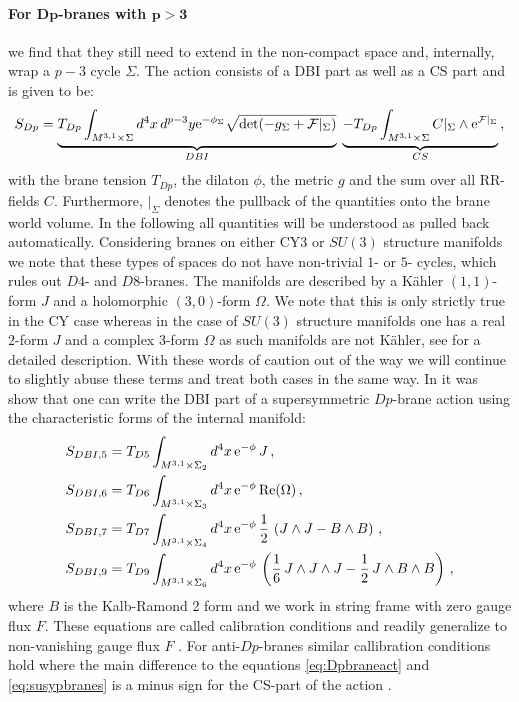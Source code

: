 \documentclass[a4paper,12pt]{report}
\newcommand{\be}{\begin{equation}}
\newcommand{\ee}{\end{equation}}
\newcommand{\bea}{\begin{equation}\begin{aligned}}
\newcommand{\eea}{\end{aligned}\end{equation}}
\def\rme{{\rm e}}
\def\rmre{{\rm Re}}
\begin{document}
\paragraph{For $\mathbf{Dp}$-branes with $\mathbf{p>3}$} we find that they still need to extend in the non-compact space and, internally, wrap a $p-3$ cycle $\Sigma$. The action consists of a DBI part as well as a CS part and is given to be:
\be 
S_{Dp} = \underbrace{T_{Dp} \int_{M^{3,1}\times \Sigma} d^4x \,d^{p-3}y \rme^{-\phi_\Sigma}\sqrt{\det (-g_\Sigma + \mathcal{F}|_\Sigma)}}_{DBI} \;\underbrace{- T_{Dp} \int_{M^{3,1}\times \Sigma} C|_\Sigma \wedge \rme^{\mathcal{F}|_\Sigma}}_{CS}\,,
\label{eq:Dpbraneact}
\ee
with the brane tension $T_{Dp}$, the dilaton $\phi$, the metric $g$ and the sum over all RR-fields $C$. Furthermore, $|_\Sigma$ denotes the pullback of the quantities onto the brane world volume. In the following all quantities will be understood as pulled back automatically. Considering branes on either CY3 or $SU(3)$ structure manifolds we note that these types of spaces do not have non-trivial $1$- or $5$- cycles, which rules out $D4$- and $D8$-branes. The manifolds are described by a Kähler $(1,1)$-form $J$ and a holomorphic $(3,0)$-form $\Omega$. We note that this is only strictly true in the CY case whereas in the case of $SU(3)$ structure manifolds one has a real $2$-form $J$ and a complex $3$-form $\Omega$ as such manifolds are not Kähler, see \cite{Grana:2005jc} for a detailed description. With these words of caution out of the way we will continue to slightly abuse these terms and treat both cases in the same way. In \cite{Blumenhagen:2006ci} it was show that one can write the DBI part of a supersymmetric $Dp$-brane action using the characteristic forms of the internal manifold:
\bea 
S_{DBI,5} &= T_{D5} \int_{M^{3,1}\times \Sigma_2} d^4x \, \rme^{-\phi} \,J\,,\\
S_{DBI,6} &= T_{D6} \int_{M^{3,1}\times \Sigma_3} d^4x \, \rme^{-\phi} \, \rmre(\Omega)\,,\\
S_{DBI,7} &= T_{D7} \int_{M^{3,1}\times \Sigma_4} d^4x \, \rme^{-\phi} \,\frac{1}{2}\,\left(J\wedge J-B\wedge B \right)\,,\\
S_{DBI,9} &= T_{D9} \int_{M^{3,1}\times \Sigma_6} d^4x \, \rme^{-\phi}\, \left(\frac{1}{6} \, J \wedge J \wedge J - \frac{1}{2}\,J \wedge B \wedge B \right)\,,
\label{eq:susypbranes}
\eea
where $B$ is the Kalb-Ramond 2 form and we work in string frame with zero gauge flux $F$. These equations are called calibration conditions and readily generalize to non-vanishing gauge flux $F$ \cite{Martucci:2005ht,Martucci:2006ij,Martucci:2011dn}. For anti-$Dp$-branes similar callibration conditions hold where the main difference to the equations \eqref{eq:Dpbraneact} and \eqref{eq:susypbranes} is a minus sign for the CS-part of the action \cite{Kallosh:2018nrk}.
\end{document}

